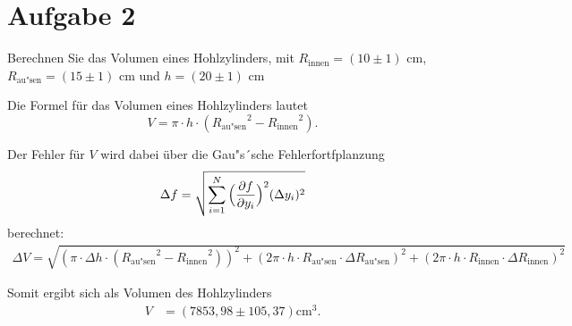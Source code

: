 \section{Aufgabe 2}
\label{sec:Aufgabe 2}
Berechnen Sie das Volumen eines Hohlzylinders, mit $R_{\text{innen}}=(10 \pm 1)$ cm, $R_{\text{au"sen}}=(15 \pm 1)$ cm und $h=(20 \pm 1)$ cm
       
Die Formel für das Volumen eines Hohlzylinders lautet
\begin{equation}
    V=\pi \cdot h \cdot({R_{\text{au"sen}}}^2-{R_{\text{innen}}}^2).
\end{equation}

Der Fehler für $V$ wird dabei über die Gau"s´sche Fehlerfortfplanzung 
\begin{equation}
    \Delta f= \sqrt{\sum_{i=1}^N {\Bigl(\frac{\partial f}{\partial y_i}\Bigr)^2 (\Delta y_i)^2}}
\end{equation}
berechnet: 
\begin{align*}
    \Delta V= \sqrt{(\pi \cdot \Delta h \cdot({R_{\text{au"sen}}}^2-{R_{\text{innen}}}^2))^2 + (2 \pi \cdot h \cdot R_{\text{au"sen}} \cdot \Delta R_{\text{au"sen}} )^2 + (2 \pi \cdot h \cdot R_{\text{innen}} \cdot \Delta R_{\text{innen}} )^2 }
\end{align*}

Somit ergibt sich als Volumen des Hohlzylinders 
\begin{align*}
    V &= (7853,98 \pm 105,37) \mathrm{cm^3}. \\
\end{align*}
